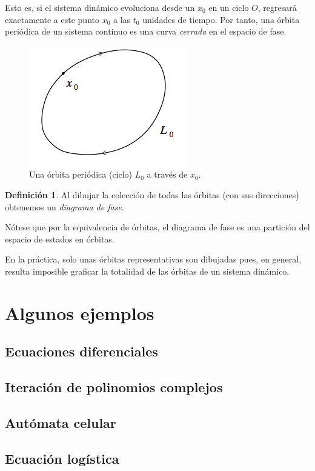 \documentclass[11pt]{book}
\theoremstyle{definition}
\newtheorem{definition}{Definición}
\numberwithin{definition}{section}
\theoremstyle{theorem}
\numberwithin{theorem}{section}
\numberwithin{lemma}{section}
\numberwithin{corollary}{section}
\theoremstyle{plain}
\numberwithin{example}{section}
\begin{document}
Esto es, si el sistema din\'amico evoluciona desde un $x_0$ en un ciclo $O$,
regresar\'a exactamente a este punto $x_0$ a las $t_0$ unidades de tiempo. Por
tanto, una \'orbita peri\'odica de un sistema continuo es una curva
{\emph{cerrada}} en el espacio de fase.

\begin{figure} \label{fig:cycle} \centering
    \includegraphics[scale=0.5]{figures/orbit-cycle.png}
    \caption{Una órbita periódica (ciclo) $L_0$ a través de $x_0$.}
\end{figure}

\begin{definition}
  \label{def:phasediagram}Al dibujar la colecci\'on de todas las \'orbitas
  (con sus direcciones) obtenemos un {\emph{diagrama de fase}}.
\end{definition}

N\'otese que por la equivalencia de \'orbitas, el diagrama de fase es una
partici\'on del espacio de estados en \'orbitas.

En la pr\'actica, solo unas \'orbitas representativas son dibujadas pues, en general,
resulta imposible graficar la totalidad de las \'orbitas de un sistema din\'amico.

\section{Algunos ejemplos}
\subsection{Ecuaciones diferenciales}
\subsection{Iteración de polinomios complejos}
\subsection{Autómata celular}
\subsection{Ecuación logística}
\end{document}
